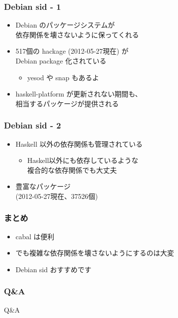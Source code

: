 \documentclass[cjk,dvipdfm,14pt]{beamer}
\begin{document}
\begin{frame}
\frametitle{Debian sid - 1}

\begin{itemize}
\item Debian のパッケージシステムが\\依存関係を壊さないように保ってくれる
\item 517個の hackage (2012-05-27現在) が\\ Debian package 化されている
  \begin{itemize}
  \item yesod や snap もあるよ
  \end{itemize}
\item haskell-platform が更新されない期間も、\\相当するパッケージが提供される
\end{itemize}

\end{frame}

\begin{frame}
\frametitle{Debian sid - 2}

\begin{itemize}
\item Haskell 以外の依存関係も管理されている
  \begin{itemize}
  \item Haskell以外にも依存しているような\\複合的な依存関係でも大丈夫
  \end{itemize}
\item 豊富なパッケージ\\(2012-05-27現在、37526個)
\end{itemize}

\end{frame}

\begin{frame}
\frametitle{まとめ}

\begin{itemize}
\item cabal は便利
\item でも複雑な依存関係を壊さないようにするのは大変
\item Debian sid おすすめです
\end{itemize}

\end{frame}

\begin{frame}
\frametitle{Q\&A}

{\Huge Q\&A}

\end{frame}
\end{document}
